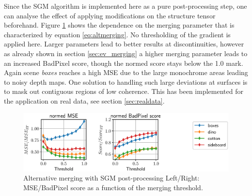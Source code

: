 \documentclass  [
  paper    = a4,
  BCOR     = 10mm,
  twoside,
  fontsize = 12pt,
  fleqn,
  toc      = bibnumbered,
  toc      = listofnumbered,
  numbers  = noendperiod,
  headings = normal,
  listof   = leveldown,
  version  = 3.03
]                                       {scrreprt}
\begin{document}
Since the SGM algorithm is implemented here as a pure post-processing step, one can analyse the effect of applying modifications on the structure tensor beforehand. Figure \ref{fig:chooselowersgmppr} shows the dependence on the merging parameter that is characterized by equation \ref{eq:altmerging}. No thresholding of the gradient is applied here. Larger parameters lead to better results at discontinuities, however as already shown in section \ref{sec:ev_merging} a higher merging parameter leads to an increased BadPixel score, though the normed score stays below the 1.0 mark. Again scene \textit{boxes} reaches a high MSE due to the large monochrome areas leading to noisy depth maps. One solution to handling such large deviations at surfaces is to mask out contiguous regions of low coherence. This has been implemented for the application on real data, see section \ref{sec:realdata}.\\
\begin{figure}[h!]
	\centering
	\includegraphics[width=1\linewidth]{images/choose_lower_sgm_ppr}
	\caption[Alternative merging with SGM post-processing]{Alternative merging with SGM post-processing Left/Right: MSE/BadPixel score as a function of the merging threshold.}
	\label{fig:chooselowersgmppr}
\end{figure}
\end{document}
